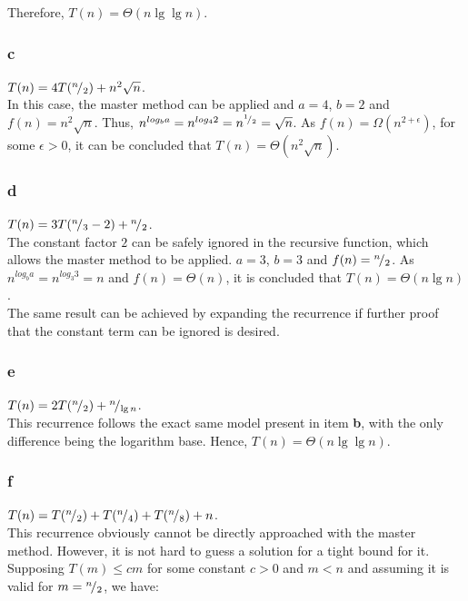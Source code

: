 \documentclass[8pt,a4paper]{article}
\begin{document}
  Therefore, $T(n) = \Theta(n \lg \lg n)$.

\subsubsection*{c}

$T(n) = 4T({}^{n}\!/_{2}) + n^{2}\sqrt{n}$. \\

  In this case, the master method can be applied and $a = 4$, $b =2$ and $f(n) = n^{2}\sqrt{n}$.
Thus, $n^{log_{b} a} = n^{log_{4} 2} = n^{{}^{1}\!/_{2}} = \sqrt{n}$. As $f(n) = \Omega(n^{2 + \epsilon})$,
for some $\epsilon > 0$, it can be concluded that $T(n) = \Theta(n^{2} \sqrt{n})$.

\subsubsection*{d}


$T(n) = 3T({}^{n}\!/_{3} - 2) + {}^{n}\!/_{2}$. \\

  The constant factor $2$ can be safely ignored in the recursive function, which
allows the master method to be applied. $a = 3$, $b = 3$ and $f(n) = {}^{n}\!/_{2}$.
As $n^{log_{b} a} = n^{log_{3} 3} = n$ and $f(n) = \Theta(n)$, it is concluded that
$T(n) = \Theta(n \lg n)$. \\

  The same result can be achieved by expanding the recurrence if further proof that
the constant term can be ignored is desired.

\subsubsection*{e}

$T(n) = 2T({}^{n}\!/_{2}) + {}^{n}\!/_{\lg n}$. \\

  This recurrence follows the exact same model present in item \textbf{b}, with the
only difference being the logarithm base. Hence, $T(n) = \Theta(n \lg \lg n)$.

\subsubsection*{f}

$T(n) = T({}^{n}\!/_{2}) + T({}^{n}\!/_{4}) + T({}^{n}\!/_{8}) + n$. \\

  This recurrence obviously cannot be directly approached with the master method.
However, it is not hard to guess a solution for a tight bound for it. Supposing
$T(m) \leq cm$ for some constant $c > 0$ and $m < n$ and assuming it is valid
for $m = {}^{n}\!/_{2}$, we have:
\end{document}
